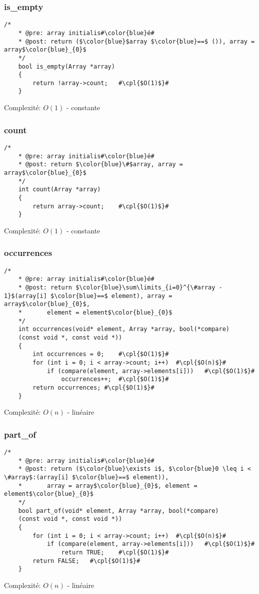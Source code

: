 \documentclass[a4paper, 11pt, oneside]{article}
\begin{document}
	\subsubsection{is\_empty}
	\begin{lstlisting}[mathescape]
	/*
	* @pre: array initialis#\color{blue}é#
	* @post: return ($\color{blue}$array $\color{blue}==$ ()), array = array$\color{blue}_{0}$
	*/
	bool is_empty(Array *array) 
	{
		return !array->count;	#\cpl{$O(1)$}#
	}
	\end{lstlisting}
	Complexité: $O(1)$ - constante
	
	\subsubsection{count}
	\begin{lstlisting}[mathescape]
	/*
	* @pre: array initialis#\color{blue}é#
	* @post: return $\color{blue}\#$array, array = array$\color{blue}_{0}$
	*/
	int count(Array *array) 
	{
		return array->count;	#\cpl{$O(1)$}#
	}
	\end{lstlisting}
	Complexité: $O(1)$ - constante
	
	\clearpage
	\subsubsection{occurrences}
	\begin{lstlisting}[mathescape]
	/*
	* @pre: array initialis#\color{blue}é#
	* @post: return $\color{blue}\sum\limits_{i=0}^{\#array - 1}$(array[i] $\color{blue}==$ element), array = array$\color{blue}_{0}$,
	*		element = element$\color{blue}_{0}$
	*/
	int occurrences(void* element, Array *array, bool(*compare)
	(const void *, const void *)) 
	{
		int occurrences = 0;	#\cpl{$O(1)$}#
		for (int i = 0; i < array->count; i++)	#\cpl{$O(n)$}#
			if (compare(element, array->elements[i]))	#\cpl{$O(1)$}#
				occurrences++;	#\cpl{$O(1)$}#
		return occurrences;	#\cpl{$O(1)$}#
	}
	\end{lstlisting}
	Complexité: $O(n)$ - linéaire
	
	\subsubsection{part\_of}
	\begin{lstlisting}[mathescape]
	/*
	* @pre: array initialis#\color{blue}é#
	* @post: return ($\color{blue}\exists i$, $\color{blue}0 \leq i < \#array$:(array[i] $\color{blue}==$ element)), 
	*		array = array$\color{blue}_{0}$, element = element$\color{blue}_{0}$
	*/
	bool part_of(void* element, Array *array, bool(*compare)    
	(const void *, const void *)) 
	{
		for (int i = 0; i < array->count; i++)	#\cpl{$O(n)$}#
			if (compare(element, array->elements[i]))	#\cpl{$O(1)$}#
				return TRUE;	#\cpl{$O(1)$}#
		return FALSE;	#\cpl{$O(1)$}#
	}
	\end{lstlisting}
	Complexité: $O(n)$ - linéaire
	
\end{document}
